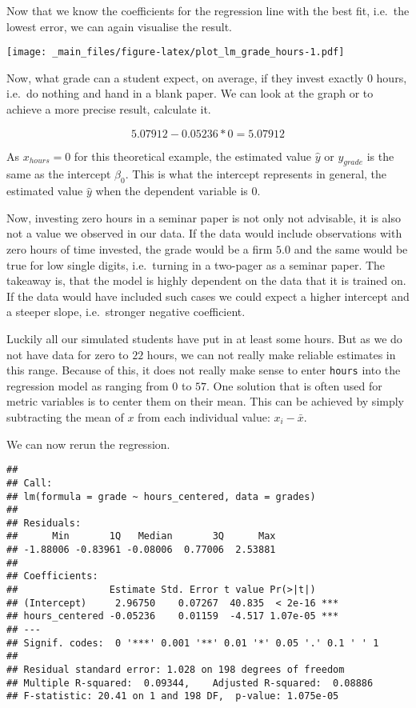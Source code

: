 \documentclass[
]{book}
\begin{document}
Now that we know the coefficients for the regression line with the best fit,
i.e.~the lowest error, we can again visualise the result.

\texttt{[image: \_main\_files/figure-latex/plot\_lm\_grade\_hours-1.pdf]}

Now, what grade can a student expect, on average, if they invest exactly 0
hours, i.e.~do nothing and hand in a blank paper. We can look at the graph or to
achieve a more precise result, calculate it.

\[5.07912 -0.05236 * 0 = 5.07912\]

As \(x_{hours} = 0\) for this theoretical example, the estimated value \(\hat{y}\)
or \(y_{grade}\) is the same as the intercept \(\beta_0\). This is what the
intercept represents in general, the estimated value \(\hat{y}\) when the
dependent variable is \(0\).

Now, investing zero hours in a seminar paper is not only not advisable, it is
also not a value we observed in our data. If the data would include observations
with zero hours of time invested, the grade would be a firm \(5.0\) and the same
would be true for low single digits, i.e.~turning in a two-pager as a seminar
paper. The takeaway is, that the model is highly dependent on the data that it
is trained on. If the data would have included such cases we could expect a
higher intercept and a steeper slope, i.e.~stronger negative coefficient.

Luckily all our simulated students have put in at least some hours. But as we do
not have data for zero to \(22\) hours, we can not really make reliable estimates
in this range. Because of this, it does not really make sense to enter \texttt{hours}
into the regression model as ranging from \(0\) to \(57\). One solution that is
often used for metric variables is to center them on their mean. This can be
achieved by simply subtracting the mean of \(x\) from each individual value:
\(x_i - \bar{x}\).

We can now rerun the regression.

\begin{verbatim}
## 
## Call:
## lm(formula = grade ~ hours_centered, data = grades)
## 
## Residuals:
##      Min       1Q   Median       3Q      Max 
## -1.88006 -0.83961 -0.08006  0.77006  2.53881 
## 
## Coefficients:
##                Estimate Std. Error t value Pr(>|t|)    
## (Intercept)     2.96750    0.07267  40.835  < 2e-16 ***
## hours_centered -0.05236    0.01159  -4.517 1.07e-05 ***
## ---
## Signif. codes:  0 '***' 0.001 '**' 0.01 '*' 0.05 '.' 0.1 ' ' 1
## 
## Residual standard error: 1.028 on 198 degrees of freedom
## Multiple R-squared:  0.09344,    Adjusted R-squared:  0.08886 
## F-statistic: 20.41 on 1 and 198 DF,  p-value: 1.075e-05
\end{verbatim}
\end{document}
